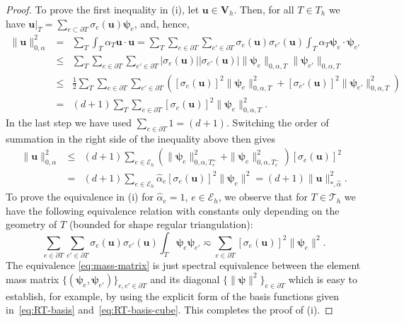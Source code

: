\documentclass[11pt]{amsart}
\numberwithin{equation}{section}
\theoremstyle{definition}\newtheorem{example}{Example}[section]
\begin{document}
\begin{proof}
To prove the first inequality in (i), let ${{\mathbf u}}\in
    {{\boldsymbol V}}_h$. Then, for all $T\in T_h$ we have ${{\mathbf u}}\big|_T =
    \sum_{e\subset\partial T}\sigma_e({{\mathbf u}}) {{\boldsymbol \psi}}_e$,  and,  hence, 
\begin{eqnarray*}
\|{{\mathbf u}}\|^2_{0,\alpha} & = & 
\sum_T \int_T \alpha_T{{\mathbf u}}\cdot {{\mathbf u}}  
=  
\sum_T 
\sum_{e\in\partial T}\sum_{e'\in \partial T}
\sigma_e({{\mathbf u}})\sigma_{e'}({{\mathbf u}})\int_T \alpha_T{{\boldsymbol \psi}}_e\cdot {{\boldsymbol \psi}}_{e'}
\\[1.7ex]
&\le &
\sum_T 
\sum_{e\in\partial T}\sum_{e'\in \partial T}
|\sigma_e({{\mathbf u}})||\sigma_{e'}({{\mathbf u}})|\|{{\boldsymbol \psi}}_e\|_{0,\alpha,T}\|{{\boldsymbol \psi}}_{e'}\|_{0,\alpha,T}
\\[1.7ex]
&\le &
\frac12\sum_T 
\sum_{e\in\partial T}\sum_{e'\in \partial T}
\left([\sigma_e({{\mathbf u}})]^2\|{{\boldsymbol \psi}}_e\|^2_{0,\alpha,T}+
[\sigma_{e'}({{\mathbf u}})]^2\|{{\boldsymbol \psi}}_{e'}\|^2_{0,\alpha,T}\right)
\\[1.7ex]
& = & 
(d+1)\sum_T 
\sum_{e\in\partial T}[\sigma_e({{\mathbf u}})]^2\|{{\boldsymbol \psi}}_e\|^2_{0,\alpha,T}. 
\end{eqnarray*}
In the last step we have used $\sum_{e\in \partial T} 1 = (d+1)$. 
Switching the order of summation in the right side of the inequality above then gives 
\begin{equation}\label{eq:norm-equivalence}
\begin{array}{rcl}
\|{{\mathbf u}}\|^2_{0,\alpha} & \le & 
(d+1)\sum_{e\in\mathcal{E}_h}\left(\| {{\boldsymbol \psi}}_e\|^2_{0,\alpha,T^+_e}
  +\|{{\boldsymbol \psi}}_e\|^2_{0,\alpha,T_e^-} 
\right)
[\sigma_e({{\mathbf u}})]^2 \\[1.7ex]
& = & 
(d+1)\sum_{e\in\mathcal{E}_h}\widehat{\alpha}_{e}[\sigma_e({{\mathbf u}})]^2\|  {{\boldsymbol \psi}}_e\|^2
 = (d+1)\|{{\mathbf u}}\|^2_{*,\widehat{\alpha}}.
\end{array}
\end{equation}
To prove the equivalence in (i) for $\widehat{\alpha}_e=1$,
$e\in\mathcal{E}_h$, we observe that for $T\in \mathcal T_h$ 
we have the following equivalence  relation
with constants only depending on the geometry of $T$ 
(bounded for shape regular triangulation):
\begin{equation}\label{eq:mass-matrix}
\sum_{e\in\partial T}\sum_{e'\in \partial T}
 \sigma_e({{\mathbf u}} )\sigma_{e'}({{\mathbf u}})\int_T {{\boldsymbol \psi}}_e {{\boldsymbol \psi}}_{e'}
 \eqsim \sum_{e\in\partial T} [\sigma_e({{\mathbf u}})]^2\| {{\boldsymbol \psi}}_e\|^2.
\end{equation}
The equivalence \eqref{eq:mass-matrix}  is just spectral equivalence between the
  element mass matrix 
$\{({{\boldsymbol \psi}}_e,{{\boldsymbol \psi}}_{e'})\}_{e,e'\in\partial T}$
  and its diagonal $\{\|{{\boldsymbol \psi}}\|^2\}_{e\in\partial T}$ which is easy 
  to establish, for example, by using the explicit form of the basis 
  functions given in~\eqref{eq:RT-basis}
  and~\eqref{eq:RT-basis-cube}. 
This completes the proof of (i). 


\end{proof}
\end{document}
